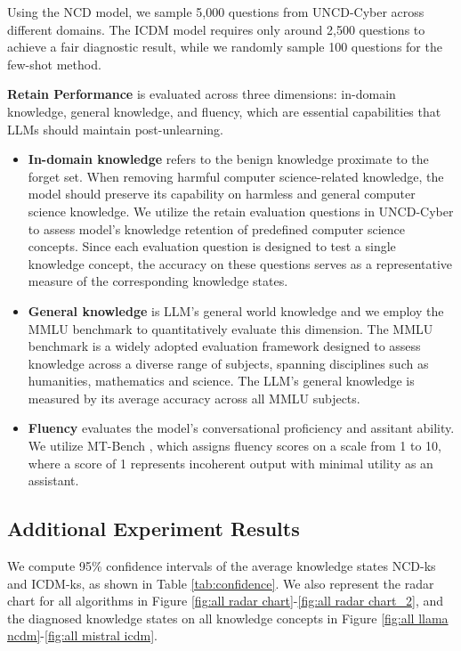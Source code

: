 Using the NCD model, we sample 5,000 questions from UNCD-Cyber across different domains. The ICDM model requires only around 2,500 questions to achieve a fair diagnostic result, while we randomly sample 100 questions for the few-shot method.

\noindent\textbf{Retain Performance} is evaluated across three dimensions: in-domain knowledge, general knowledge, and fluency, which are essential capabilities that LLMs should maintain post-unlearning.

\begin{itemize}[nolistsep, leftmargin=*]
    \item \textbf{In-domain knowledge} refers to the benign knowledge proximate to the forget set. When removing harmful computer science-related knowledge, the model should preserve its capability on harmless and general computer science knowledge. We utilize the retain evaluation questions in UNCD-Cyber to assess model's knowledge retention of predefined computer science concepts. Since each evaluation question is designed to test a single knowledge concept, the accuracy on these questions serves as a representative measure of the corresponding knowledge states. 
    \item \textbf{General knowledge} is LLM's general world knowledge and we employ the MMLU benchmark \citep{hendrycks2020measuring} to quantitatively evaluate this dimension. The MMLU benchmark is a widely adopted evaluation framework designed to assess knowledge across a diverse range of subjects, spanning disciplines such as humanities, mathematics and science. The LLM's general knowledge is measured by its average accuracy across all MMLU subjects.
    \item \textbf{Fluency} evaluates the model's conversational proficiency and assitant ability. We utilize MT-Bench \citep{zheng2023judging}, which assigns fluency scores on a scale from 1 to 10, where a score of 1 represents incoherent output with minimal utility as an assistant.
\end{itemize}



\subsection{Additional Experiment Results}

We compute 95\% confidence intervals of the average knowledge states NCD-ks and ICDM-ks, as shown in Table \ref{tab:confidence}. We also represent the radar chart for all algorithms in Figure \ref{fig:all radar chart}-\ref{fig:all radar chart_2}, and the diagnosed knowledge states on all knowledge concepts in Figure \ref{fig:all llama ncdm}-\ref{fig:all mistral icdm}.


